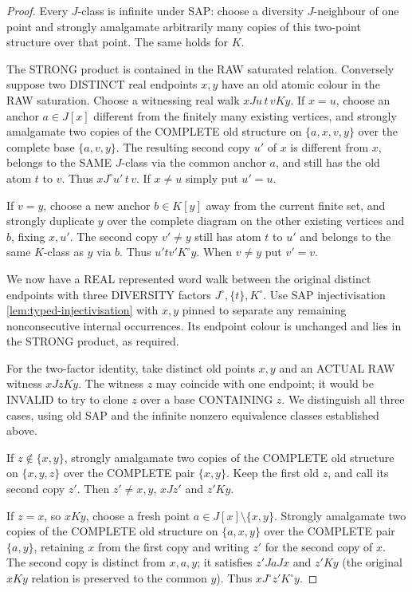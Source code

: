 \begin{proof}
Every \(J\)-class is infinite
under SAP: choose a diversity
\(J\)-neighbour of one point
and strongly amalgamate arbitrarily
many copies of this two-point
structure over that point.
The same holds for \(K\).

The STRONG product is contained
in the RAW saturated relation.
Conversely suppose two DISTINCT
real endpoints \(x,y\) have
an old atomic colour in the
RAW saturation. Choose a
witnessing real walk
\(xJu\,t\,vKy\).
If \(x=u\), choose an anchor
\(a\in J[x]\) different from
the finitely many existing
vertices, and strongly amalgamate
two copies of the COMPLETE
old structure on
\(\{a,x,v,y\}\) over the
complete base \(\{a,v,y\}\).
The resulting second copy \(u'\)
of \(x\) is different from
\(x\), belongs to the SAME
\(J\)-class via the common
anchor \(a\), and still has
the old atom \(t\) to \(v\).
Thus \(xJ^\circ u'\,t\,v\).
If \(x\ne u\) simply put
\(u'=u\).

If \(v=y\), choose a new
anchor \(b\in K[y]\) away
from the current finite set,
and strongly duplicate \(y\)
over the complete diagram on
the other existing vertices
and \(b\), fixing \(x,u'\).
The second copy \(v'\ne y\)
still has atom \(t\) to \(u'\)
and belongs to the same
\(K\)-class as \(y\) via \(b\).
Thus \(u'tv'K^\circ y\).
When \(v\ne y\) put \(v'=v\).

We now have a REAL represented
word walk between the original
distinct endpoints with three
DIVERSITY factors
\(J^\circ,\{t\},K^\circ\).
Use SAP injectivisation
\cref{lem:typed-injectivisation}
with \(x,y\) pinned to
separate any remaining
nonconsecutive internal
occurrences. Its endpoint
colour is unchanged and
lies in the STRONG product,
as required.

For the two-factor identity, take
distinct old points \(x,y\) and
an ACTUAL RAW witness \(xJzKy\).
The witness \(z\) may coincide
with one endpoint; it would be
INVALID to try to clone \(z\)
over a base CONTAINING \(z\).
We distinguish all three cases,
using old SAP and the infinite
nonzero equivalence classes
established above.

If \(z\notin\{x,y\}\),
strongly amalgamate two copies
of the COMPLETE old structure
on \(\{x,y,z\}\) over the
COMPLETE pair \(\{x,y\}\).
Keep the first old \(z\),
and call its second copy \(z'\).
Then \(z'\ne x,y\),
\(xJz'\) and \(z'Ky\).

If \(z=x\), so \(xKy\),
choose a fresh point
\(a\in J[x]\setminus\{x,y\}\).
Strongly amalgamate two copies
of the COMPLETE old structure
on \(\{a,x,y\}\) over the
COMPLETE pair \(\{a,y\}\),
retaining \(x\) from the first
copy and writing \(z'\)
for the second copy of \(x\).
The second copy is distinct
from \(x,a,y\); it satisfies
\(z'JaJx\) and \(z'Ky\)
(the original \(xKy\) relation
is preserved to the common \(y\)).
Thus \(xJ^\circ z'K^\circ y\).


\end{proof}

